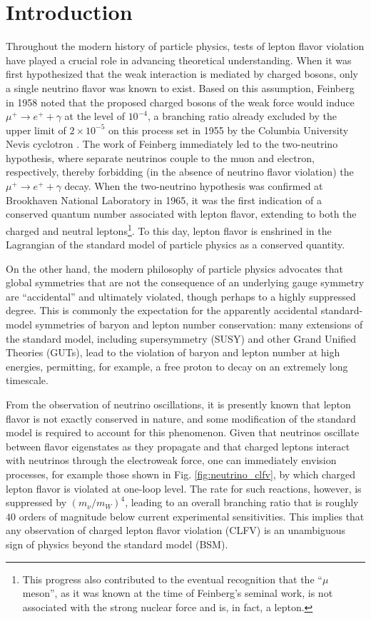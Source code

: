 \documentclass[12pt,letterpaper]{book}
\begin{document}
\chapter{Introduction}
\thispagestyle{headings}
Throughout the modern history of particle physics, tests of lepton flavor violation have played a crucial role in advancing theoretical understanding. When it was first hypothesized that the weak interaction is mediated by charged bosons, only a single neutrino flavor was known to exist. Based on this assumption, Feinberg \cite{PhysRev.110.1482} in 1958 noted that the proposed charged bosons of the weak force would induce $\mu^+\rightarrow e^+ + \gamma$ at the level of $10^{-4}$, a branching ratio already excluded by the upper limit of $2\times 10^{-5}$ on this process set in 1955 by the Columbia University Nevis cyclotron \cite{PhysRev.98.240}. The work of Feinberg immediately led to the two-neutrino hypothesis, where separate neutrinos couple to the muon and electron, respectively, thereby forbidding (in the absence of neutrino flavor violation) the $\mu^+\rightarrow e^+ + \gamma$ decay. When the two-neutrino hypothesis was confirmed at Brookhaven National Laboratory \cite{PhysRevLett.9.36} in 1965, it was the first indication of a conserved quantum number associated with lepton flavor, extending to both the charged and neutral leptons\footnote{This progress also contributed to the eventual recognition that the ``$\mu$ meson'', as it was known at the time of Feinberg's seminal work, is not associated with the strong nuclear force and is, in fact, a lepton.}. To this day, lepton flavor is enshrined in the Lagrangian of the standard model of particle physics as a conserved quantity. 

On the other hand, the modern philosophy of particle physics advocates that global symmetries that are not the consequence of an underlying gauge symmetry are ``accidental'' and ultimately violated, though perhaps to a highly suppressed degree. This is commonly the expectation for the apparently accidental standard-model symmetries of baryon and lepton number conservation: many extensions of the standard model, including supersymmetry (SUSY) and other Grand Unified Theories (GUTs), lead to the violation of baryon and lepton number at high energies, permitting, for example, a free proton to decay on an extremely long timescale. 

From the observation of neutrino oscillations, it is presently known that lepton flavor is not exactly conserved in nature, and some modification of the standard model is required to account for this phenomenon. Given that neutrinos oscillate between flavor eigenstates as they propagate and that charged leptons interact with neutrinos through the electroweak force, one can immediately envision processes, for example those shown in Fig. \ref{fig:neutrino_clfv}, by which charged lepton flavor is violated at one-loop level. The rate for such reactions, however, is suppressed by $(m_{\nu}/m_W)^4$, leading to an overall branching ratio that is roughly $40$ orders of magnitude below current experimental sensitivities. This implies that any observation of charged lepton flavor violation (CLFV) is an unambiguous sign of physics beyond the standard model (BSM).
\end{document}
